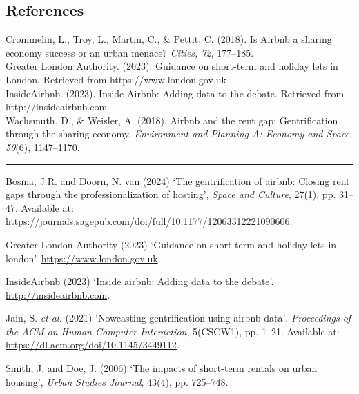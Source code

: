 \documentclass[
  a4paper,
  DIV=11,
  numbers=noendperiod]{scrartcl}
\newlength{\cslhangindent}
\newenvironment{CSLReferences}[2] %
 {\begin{list}{}{%
  \setlength{\itemindent}{0pt}
  \setlength{\leftmargin}{0pt}
  \setlength{\parsep}{0pt}
  \ifodd #1
   \setlength{\leftmargin}{\cslhangindent}
   \setlength{\itemindent}{-1\cslhangindent}
  \fi
  \setlength{\itemsep}{#2\baselineskip}}}
 {\end{list}}
\begin{document}
\subsection{References}\label{references}

Crommelin, L., Troy, L., Martin, C., \& Pettit, C. (2018). Is Airbnb a
sharing economy success or an urban menace? \emph{Cities, 72},
177--185.\\
Greater London Authority. (2023). Guidance on short-term and holiday
lets in London. Retrieved from https://www.london.gov.uk\\
InsideAirbnb. (2023). Inside Airbnb: Adding data to the debate.
Retrieved from http://insideairbnb.com\\
Wachsmuth, D., \& Weisler, A. (2018). Airbnb and the rent gap:
Gentrification through the sharing economy. \emph{Environment and
Planning A: Economy and Space, 50}(6), 1147--1170.

\begin{center}\rule{0.5\linewidth}{0.5pt}\end{center}

\label{refs}
\begin{CSLReferences}{0}{1}
Bosma, J.R. and Doorn, N. van (2024) {`The gentrification of airbnb:
Closing rent gaps through the professionalization of hosting'},
\emph{Space and Culture}, 27(1), pp. 31--47. Available at:
\url{https://journals.sagepub.com/doi/full/10.1177/12063312221090606}.

Greater London Authority (2023) {`Guidance on short-term and holiday
lets in london'}. \url{https://www.london.gov.uk}.

InsideAirbnb (2023) {`Inside airbnb: Adding data to the debate'}.
\url{http://insideairbnb.com}.

Jain, S. \emph{et al.} (2021) {`Nowcasting gentrification using airbnb
data'}, \emph{Proceedings of the ACM on Human-Computer Interaction},
5(CSCW1), pp. 1--21. Available at:
\url{https://dl.acm.org/doi/10.1145/3449112}.

Smith, J. and Doe, J. (2006) {`The impacts of short-term rentals on
urban housing'}, \emph{Urban Studies Journal}, 43(4), pp. 725--748.

\end{CSLReferences}
\end{document}
